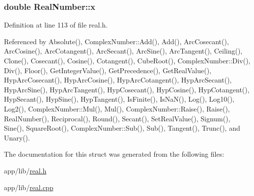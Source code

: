 \subsubsection[{\texorpdfstring{x}{x}}]{\setlength{\rightskip}{0pt plus 5cm}double Real\+Number\+::x\hspace{0.3cm}{\ttfamily [private]}}\hypertarget{structRealNumber_ac33d80bee75448490199a0aa48ccce1e}{}\label{structRealNumber_ac33d80bee75448490199a0aa48ccce1e}


Definition at line 113 of file real.\+h.



Referenced by Absolute(), Complex\+Number\+::\+Add(), Add(), Arc\+Cosecant(), Arc\+Cosine(), Arc\+Cotangent(), Arc\+Secant(), Arc\+Sine(), Arc\+Tangent(), Ceiling(), Clone(), Cosecant(), Cosine(), Cotangent(), Cube\+Root(), Complex\+Number\+::\+Div(), Div(), Floor(), Get\+Integer\+Value(), Get\+Precedence(), Get\+Real\+Value(), Hyp\+Arc\+Cosecant(), Hyp\+Arc\+Cosine(), Hyp\+Arc\+Cotangent(), Hyp\+Arc\+Secant(), Hyp\+Arc\+Sine(), Hyp\+Arc\+Tangent(), Hyp\+Cosecant(), Hyp\+Cosine(), Hyp\+Cotangent(), Hyp\+Secant(), Hyp\+Sine(), Hyp\+Tangent(), Is\+Finite(), Is\+Na\+N(), Log(), Log10(), Log2(), Complex\+Number\+::\+Mul(), Mul(), Complex\+Number\+::\+Raise(), Raise(), Real\+Number(), Reciprocal(), Round(), Secant(), Set\+Real\+Value(), Signum(), Sine(), Square\+Root(), Complex\+Number\+::\+Sub(), Sub(), Tangent(), Trunc(), and Unary().



The documentation for this struct was generated from the following files\+:\begin{DoxyCompactItemize}
\item 
app/lib/\hyperlink{real_8h}{real.\+h}\item 
app/lib/\hyperlink{real_8cpp}{real.\+cpp}\end{DoxyCompactItemize}
